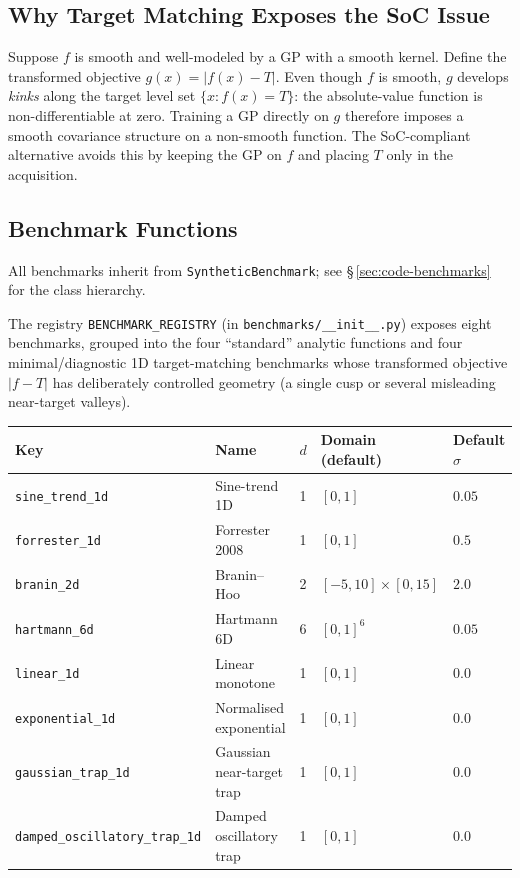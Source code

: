 \documentclass[11pt]{article}
\begin{document}
\subsection{Why Target Matching Exposes the SoC Issue}
 
Suppose $f$ is smooth and well-modeled by a GP with a smooth kernel.
Define the transformed objective $g(x) = |f(x)-T|$.
Even though $f$ is smooth, $g$ develops \emph{kinks} along the target level set
$\{x: f(x) = T\}$: the absolute-value function is non-differentiable at zero.
Training a GP directly on $g$ therefore imposes a smooth covariance structure on a
non-smooth function. The SoC-compliant alternative avoids this by keeping the GP on $f$
and placing $T$ only in the acquisition.
 
\subsection{Benchmark Functions}
 
All benchmarks inherit from \texttt{SyntheticBenchmark}; see
\S\,\ref{sec:code-benchmarks} for the class hierarchy.
 
The registry \texttt{BENCHMARK\_REGISTRY} (in \texttt{benchmarks/\_\_init\_\_.py})
exposes eight benchmarks, grouped into the four ``standard'' analytic functions
and four minimal/diagnostic 1D target-matching benchmarks whose transformed
objective $|f-T|$ has deliberately controlled geometry (a single cusp or
several misleading near-target valleys).

\begin{center}
\begin{tabular}{lllll}
\toprule
Key & Name & $d$ & Domain (default) & Default $\sigma$ \\
\midrule
\texttt{sine\_trend\_1d} & Sine-trend 1D & 1 & $[0,1]$ & $0.05$ \\
\texttt{forrester\_1d}  & Forrester 2008 & 1 & $[0,1]$ & $0.5$ \\
\texttt{branin\_2d}     & Branin--Hoo    & 2 & $[-5,10]\times[0,15]$ & $2.0$ \\
\texttt{hartmann\_6d}   & Hartmann 6D    & 6 & $[0,1]^6$ & $0.05$ \\
\midrule
\texttt{linear\_1d}              & Linear monotone        & 1 & $[0,1]$ & $0.0$ \\
\texttt{exponential\_1d}         & Normalised exponential & 1 & $[0,1]$ & $0.0$ \\
\texttt{gaussian\_trap\_1d}      & Gaussian near-target trap & 1 & $[0,1]$ & $0.0$ \\
\texttt{damped\_oscillatory\_trap\_1d} & Damped oscillatory trap & 1 & $[0,1]$ & $0.0$ \\
\bottomrule
\end{tabular}
\end{center}
\end{document}
